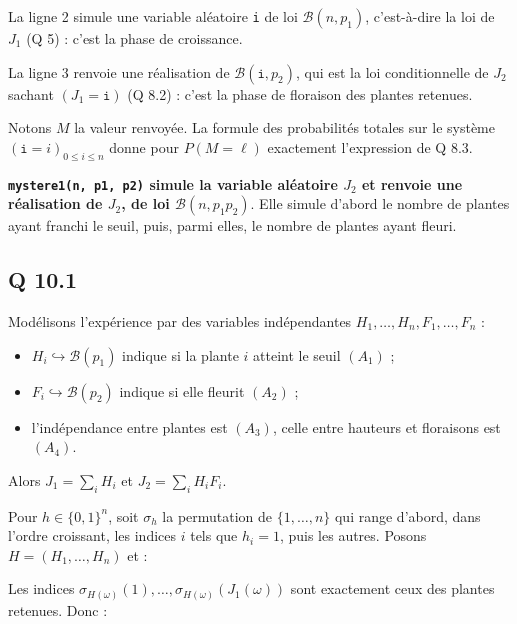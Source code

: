 \documentclass[11pt,a4paper]{article}
\providecommand{\tightlist}{\setlength{\itemsep}{0pt}\setlength{\parskip}{0pt}}
\newcommand{\equationajustee}[1]{%
  \sbox{\boiteequation}{$\displaystyle #1$}%
  \ifdim\wd\boiteequation>\linewidth
    \[\resizebox{\linewidth}{!}{\usebox{\boiteequation}}\]%
  \else
    \[#1\]%
  \fi}
\begin{document}
La ligne 2 simule une variable aléatoire \texttt{i} de loi \(\mathcal B(n,p_1)\), c'est-à-dire la loi de \(J_1\) (Q 5) : c'est la phase de croissance.

La ligne 3 renvoie une réalisation de \(\mathcal B(\texttt i,p_2)\), qui est la loi conditionnelle de \(J_2\) sachant \((J_1=\texttt i)\) (Q 8.2) : c'est la phase de floraison des plantes retenues.

Notons \(M\) la valeur renvoyée. La formule des probabilités totales sur le système \((\texttt i=i)_{0\le i\le n}\) donne pour \(P(M=\ell)\) exactement l'expression de Q 8.3.

\textbf{\texttt{mystere1(\allowbreak{}n,\allowbreak{}\ p1,\allowbreak{}\ p2)\allowbreak{}} simule la variable aléatoire \(J_2\) et renvoie une réalisation de \(J_2\), de loi \(\mathcal B(n,p_1p_2)\)}. Elle simule d'abord le nombre de plantes ayant franchi le seuil, puis, parmi elles, le nombre de plantes ayant fleuri.

\hypertarget{q-10.1}{%
\subsection{Q 10.1}\label{q-10.1}}

Modélisons l'expérience par des variables indépendantes \(H_1,\dots,H_n,F_1,\dots,F_n\) :

\begin{itemize}
\tightlist
\item
  \(H_i\hookrightarrow\mathcal B(p_1)\) indique si la plante \(i\) atteint le seuil \((A_1)\) ;
\item
  \(F_i\hookrightarrow\mathcal B(p_2)\) indique si elle fleurit \((A_2)\) ;
\item
  l'indépendance entre plantes est \((A_3)\), celle entre hauteurs et floraisons est \((A_4)\).
\end{itemize}

Alors \(J_1=\sum_iH_i\) et \(J_2=\sum_iH_iF_i\).

Pour \(h\in\{0,1\}^n\), soit \(\sigma_h\) la permutation de \(\{1,\dots,n\}\) qui range d'abord, dans l'ordre croissant, les indices \(i\) tels que \(h_i=1\), puis les autres. Posons \(H=(H_1,\dots,H_n)\) et :

\equationajustee{X_k(\omega)=F_{\sigma_{H(\omega)}(k)}(\omega).}

Les indices \(\sigma_{H(\omega)}(1),\dots,\sigma_{H(\omega)}(J_1(\omega))\) sont exactement ceux des plantes retenues. Donc :

\equationajustee{\begin{aligned}
J_2(\omega)&=\sum_{i:\,H_i(\omega)=1}F_i(\omega)\\
&=\sum_{k=1}^{J_1(\omega)}X_k(\omega),
\end{aligned}}
\end{document}
